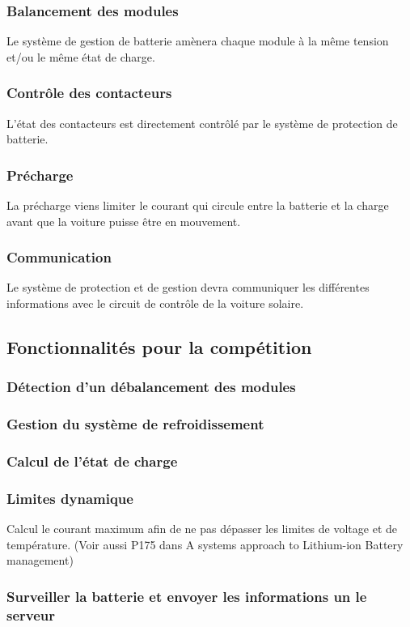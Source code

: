 		\subsubsection{Balancement des modules}
		Le système de gestion de batterie amènera chaque module à la même tension et/ou le même état de charge. 
		
		\subsubsection{Contrôle des contacteurs}
		L'état des contacteurs est directement contrôlé par le système de protection de batterie. 
		
		\subsubsection{Précharge}
		La précharge viens limiter le courant qui circule entre la batterie et la charge avant que la voiture puisse être en mouvement.
		
		\subsubsection{Communication}
		Le système de protection et de gestion devra communiquer les différentes informations avec le circuit de contrôle de la voiture solaire. 
	
	\subsection{Fonctionnalités pour la compétition}
		\subsubsection{Détection d'un débalancement des modules}	
	
		\subsubsection{Gestion du système de refroidissement}
		
		\subsubsection{Calcul de l'état de charge}
		
		\subsubsection{Limites dynamique}
		Calcul le courant maximum afin de ne pas dépasser les limites de voltage et de température. (Voir aussi P175 dans A systems approach to Lithium-ion Battery management)
		
		\subsubsection{Surveiller la batterie et envoyer les informations un le serveur}
		
		
